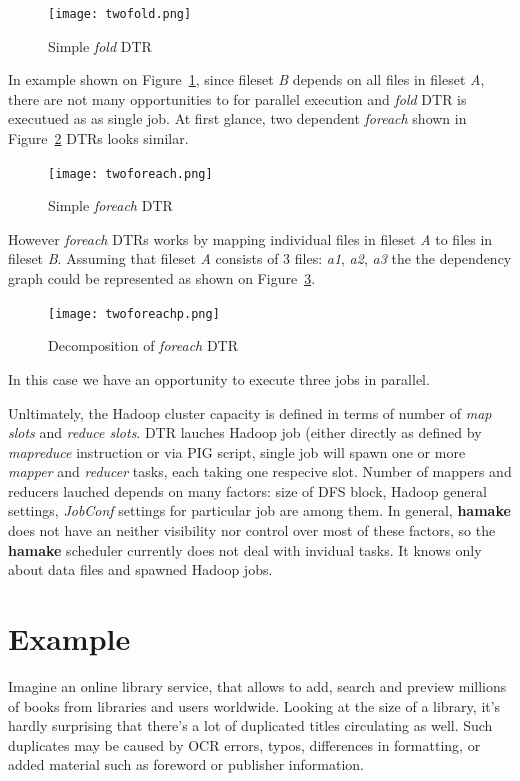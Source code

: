 \documentclass[11pt,twocolumn]{article}
\begin{document}
\begin{figure}[htp]
\centering
\texttt{[image: twofold.png]}
\caption{Simple \emph{fold} DTR}
\label{fig:fold1}
\end{figure}

In example shown on Figure~\ref{fig:fold1}, since fileset \textit{B}
depends on all files in fileset \textit{A}, there are not many
opportunities to for parallel execution and \emph{fold} DTR is
executued as as single job. At first glance, two dependent
\emph{foreach} shown in Figure~\ref{fig:foreach1} DTRs looks similar.

\begin{figure}[htp]
\centering
\texttt{[image: twoforeach.png]}
\caption{Simple \emph{foreach} DTR}
\label{fig:foreach1}
\end{figure}

However \emph{foreach} DTRs works by mapping individual files in
fileset \textit{A} to files in fileset \textit{B}. Assuming that
fileset \textit{A} consists of 3 files: \textit{a1}, \textit{a2},
\textit{a3} the the dependency graph could be represented as shown on
Figure~\ref{fig:foreach2}.

\begin{figure}[htp]
\centering
\texttt{[image: twoforeachp.png]}
\caption{Decomposition of \emph{foreach} DTR}
\label{fig:foreach2}
\end{figure}

In this case we have an opportunity to execute three jobs in parallel.

Unltimately, the Hadoop cluster capacity is defined in terms of number
of \textit{map slots} and \textit{reduce slots}.  DTR lauches Hadoop
job (either directly as defined by \emph{mapreduce} instruction or via
PIG script, single job will spawn one or more \emph{mapper} and
\emph{reducer} tasks, each taking one respecive slot. Number of
mappers and reducers lauched depends on many factors: size of DFS
block, Hadoop general settings, \emph{JobConf} settings for particular
job are among them. In general, \textbf{hamake} does not have an neither
visibility nor control over most of these factors, so the \textbf{hamake}
scheduler currently does not deal with invidual tasks. It knows only
about data files and spawned Hadoop jobs.

\section{Example}

Imagine an online library service, that allows to add, search and
preview millions of books from libraries and users worldwide. Looking
at the size of a library, it's hardly surprising that there's a lot of
duplicated titles circulating as well. Such duplicates may be caused
by OCR errors, typos, differences in formatting, or added material such as
foreword or publisher information.
\end{document}
